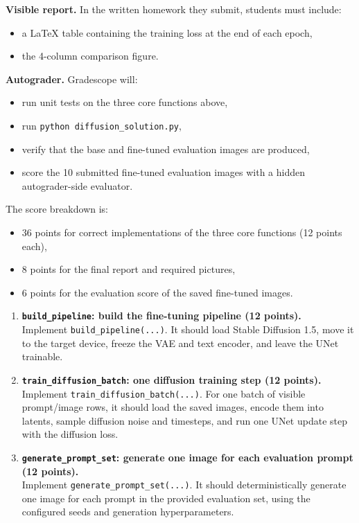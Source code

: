\begin{Q}
\medskip
\noindent\textbf{Visible report.}
In the written homework they submit, students must include:
\begin{itemize}
\item a LaTeX table containing the training loss at the end of each epoch,
\item the 4-column comparison figure.
\end{itemize}

\medskip
\noindent\textbf{Autograder.}
Gradescope will:
\begin{itemize}
\item run unit tests on the three core functions above,
\item run \texttt{python diffusion\_solution.py},
\item verify that the base and fine-tuned evaluation images are produced,
\item score the 10 submitted fine-tuned evaluation images with a hidden
autograder-side evaluator.
\end{itemize}
The score breakdown is:
\begin{itemize}
\item 36 points for correct implementations of the three core functions
(12 points each),
\item 8 points for the final report and required pictures,
\item 6 points for the evaluation score of the saved fine-tuned images.
\end{itemize}

\begin{enumerate}

\item \textbf{\texttt{build\_pipeline}: build the fine-tuning pipeline (12 points).}\\
Implement \texttt{build\_pipeline(...)}.
It should load Stable Diffusion 1.5, move it to the target device, freeze the
VAE and text encoder, and leave the UNet trainable.

\item \textbf{\texttt{train\_diffusion\_batch}: one diffusion training step (12 points).}\\
Implement \texttt{train\_diffusion\_batch(...)}.
For one batch of visible prompt/image rows, it should load the saved images,
encode them into latents, sample diffusion noise and timesteps, and run one
UNet update step with the diffusion loss.

\item \textbf{\texttt{generate\_prompt\_set}: generate one image for each evaluation prompt (12 points).}\\
Implement \texttt{generate\_prompt\_set(...)}.
It should deterministically generate one image for each prompt in the provided
evaluation set, using the configured seeds and generation hyperparameters.


\end{enumerate}
\end{Q}
